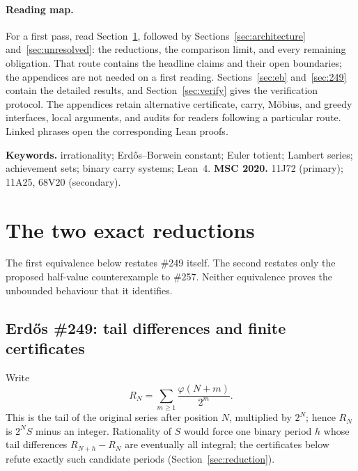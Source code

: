\documentclass[11pt]{article}
\theoremstyle{definition}
\theoremstyle{remark}
\newcommand{\ph}{\varphi}
\begin{document}
\paragraph{Reading map.}
For a first pass, read Section~\ref{sec:spines}, followed by
Sections~\ref{sec:architecture} and~\ref{sec:unresolved}: the reductions,
the comparison limit, and every remaining obligation.  That route contains
the headline claims and their open boundaries; the appendices are not needed
on a first reading.  Sections~\ref{sec:eb} and~\ref{sec:249} contain the
detailed results, and Section~\ref{sec:verify} gives the verification protocol.
The appendices retain alternative certificate, carry, M\"obius, and greedy
interfaces, local arguments, and audits for readers following a particular
route.  Linked phrases open the corresponding Lean proofs.

\medskip
\noindent\textbf{Keywords.} irrationality; Erd\H{o}s--Borwein constant;
Euler totient; Lambert series; achievement sets; binary carry systems; Lean~4.
\qquad
\textbf{MSC 2020.} 11J72 (primary); 11A25, 68V20 (secondary).

\section{The two exact reductions}\label{sec:spines}

The first equivalence below restates \#249 itself.  The second restates only
the proposed half-value counterexample to \#257.  Neither equivalence proves
the unbounded behaviour that it identifies.

\subsection{Erd\H{o}s \#249: tail differences and finite certificates}
\label{res:249story}

Write
\[
 R_N=\sum_{m\geq1}\frac{\ph(N+m)}{2^m}.
\]
This is the tail of the original series after position \(N\), multiplied by
\(2^N\); hence \(R_N\) is \(2^NS\) minus an integer.  Rationality of \(S\) would
force one binary period \(h\) whose tail differences \(R_{N+h}-R_N\) are
eventually all integral; the certificates below refute exactly such
candidate periods (Section~\ref{sec:reduction}).
\end{document}
